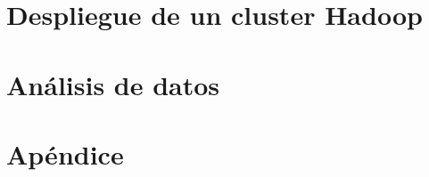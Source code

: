 \documentclass[10pt, a4paper, twoside]{report} %
\begin{document}
\part{Despliegue de un cluster Hadoop}\label{part:despliegue}










\part{Análisis de datos}\label{part:analisis_datos}






\part{Apéndice}\label{part:apendice}
\appendix

\end{document}
